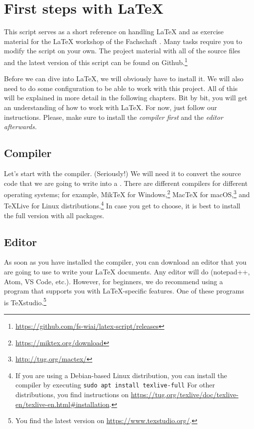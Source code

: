 \newpage
{}
\pagecolor{latexblue}

\chapter*{First steps with \LaTeX}

This script serves as a short reference on handling \LaTeX{} and as exercise material for the \LaTeX{} workshop of the Fachschaft .
Many tasks require you to modify the script on your own.
The project material with all of the source files and the latest version of this script can be found on Github.\footnote{\url{https://github.com/fs-wiai/latex-script/releases}}

Before we can dive into \LaTeX{}, we will obviously have to install it.
We will also need to do some configuration to be able to work with this project.
All of this will be explained in more detail in the following chapters.
Bit by bit, you will get an understanding of how to work with \LaTeX{}.
For now, just follow our instructions.
Please, make sure to install the \emph{compiler first} and the \emph{editor afterwards}\textit{.}

\section*{Compiler}
Let’s start with the compiler.
(Seriously!)
We will need it to convert the source code that we are going to write into a .
There are different compilers for different operating systems;
for example, MikTeX for Windows,\footnote{\url{https://miktex.org/download}} Mac\TeX{} for macOS,\footnote{\url{http://tug.org/mactex/}} and \TeX{}Live for Linux distributions.\footnote{If you are using a Debian-based Linux distribution, you can install the compiler by executing \texttt{sudo apt install texlive-full}
For other distributions, you find instructions on \url{https://tug.org/texlive/doc/texlive-en/texlive-en.html\#installation}.} 
In case you get to choose, it is best to install the full version with all packages.

\section*{Editor}
As soon as you have installed the compiler, you can download an editor that you are going to use to write your \LaTeX{} documents.
Any editor will do (notepad++, Atom, VS Code, etc.).
However, for beginners, we do recommend using a program that supports you with \LaTeX-specific features.
One of these programs is \TeX{}studio.\footnote{You find the latest version on \url{https://www.texstudio.org/}.}


